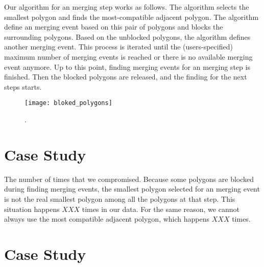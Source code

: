\documentclass[ijgi,article,submit,moreauthors,pdftex]{Definitions/mdpi}
\begin{document}
Our algorithm for an merging step works as follows.
The algorithm selects the smallest polygon and finds the most-compatible adjacent polygon.
The algorithm define an merging event based on this pair of polygons 
and blocks the surrounding polygons.
Based on the unblocked polygons, the algorithm defines another merging event.
This process is iterated 
until the (users-specified) maximum number of merging events is reached or 
there is no available merging event anymore.
Up to this point, finding merging events for an merging step is finished.
Then the blocked polygons are released, and the finding for the next steps starts.


\begin{figure}[htb]
\centering
\texttt{[image: bloked\_polygons]}
\caption{.}
\label{fig:bloked_polygons}
\end{figure}


%
%

\section{Case Study}

The number of times that we compromised.
Because some polygons are blocked during finding merging events, 
the smallest polygon selected for an merging event 
is not the real smallest polygon 
among all the polygons at that step. 
This situation happens $XXX$ times in our data.
For the same reason, we cannot always use the most compatible adjacent polygon,
which happens $XXX$ times.

\section{Case Study}
\end{document}
